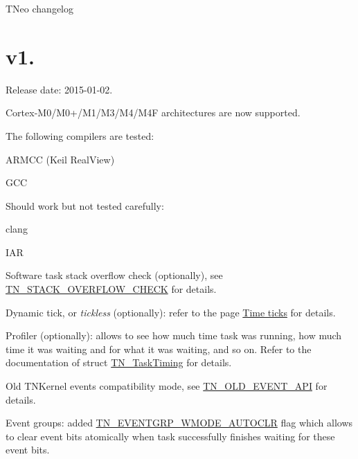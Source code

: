 T\+Neo changelog\hypertarget{changelog_changelog_v1_06}{}\section{v1.}\label{changelog_changelog_v1_06}
Release date\+: 2015-\/01-\/02.


\begin{DoxyItemize}
\item Cortex-\/\+M0/\+M0+/\+M1/\+M3/\+M4/\+M4\+F architectures are now supported.
\begin{DoxyItemize}
\item The following compilers are tested\+:
\begin{DoxyItemize}
\item A\+R\+M\+C\+C (Keil Real\+View)
\item G\+C\+C
\end{DoxyItemize}
\item Should work but not tested carefully\+:
\begin{DoxyItemize}
\item clang
\item I\+A\+R
\end{DoxyItemize}
\end{DoxyItemize}
\item Software task stack overflow check (optionally), see {\ttfamily \hyperlink{tn__cfg__default_8h_ac6a9bbac3b3b25d9b5bc8c21d2e09955}{T\+N\+\_\+\+S\+T\+A\+C\+K\+\_\+\+O\+V\+E\+R\+F\+L\+O\+W\+\_\+\+C\+H\+E\+C\+K}} for details.
\item Dynamic tick, or {\itshape tickless} (optionally)\+: refer to the page \hyperlink{time_ticks}{Time ticks} for details.
\item Profiler (optionally)\+: allows to see how much time task was running, how much time it was waiting and for what it was waiting, and so on. Refer to the documentation of {\ttfamily struct \hyperlink{structTN__TaskTiming}{T\+N\+\_\+\+Task\+Timing}} for details.
\item Old T\+N\+Kernel events compatibility mode, see {\ttfamily \hyperlink{tn__cfg__default_8h_ac61d5f6a716cdcab205a2c8afbde4242}{T\+N\+\_\+\+O\+L\+D\+\_\+\+E\+V\+E\+N\+T\+\_\+\+A\+P\+I}} for details.
\item Event groups\+: added {\ttfamily \hyperlink{tn__eventgrp_8h_a9d42ee61ae8da342f1cd6440b7e54bbdaf45098235d31f72a2b09e30792686573}{T\+N\+\_\+\+E\+V\+E\+N\+T\+G\+R\+P\+\_\+\+W\+M\+O\+D\+E\+\_\+\+A\+U\+T\+O\+C\+L\+R}} flag which allows to clear event bits atomically when task successfully finishes waiting for these event bits.

\end{DoxyItemize}
